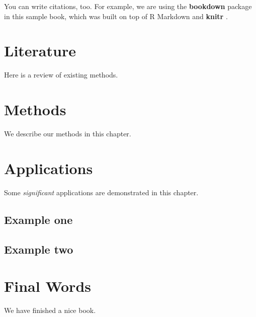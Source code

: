 \documentclass[]{book}
\begin{document}
You can write citations, too. For example, we are using the \textbf{bookdown} package \citep{R-bookdown} in this sample book, which was built on top of R Markdown and \textbf{knitr} \citep{xie2015}.

\hypertarget{literature}{%
\chapter{Literature}\label{literature}}

Here is a review of existing methods.

\hypertarget{methods}{%
\chapter{Methods}\label{methods}}

We describe our methods in this chapter.

\hypertarget{applications}{%
\chapter{Applications}\label{applications}}

Some \emph{significant} applications are demonstrated in this chapter.

\hypertarget{example-one}{%
\section{Example one}\label{example-one}}

\hypertarget{example-two}{%
\section{Example two}\label{example-two}}

\hypertarget{final-words}{%
\chapter{Final Words}\label{final-words}}

We have finished a nice book.


\end{document}
